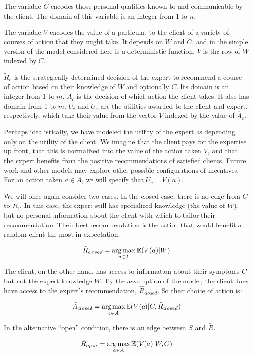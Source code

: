 \documentclass[../thesis.tex]{subfiles}
\begin{document}
The variable $C$ encodes those personal qualities known to
and communicable by the client.
The domain of this variable is an integer from 1 to $n$.

The variable $V$ encodes the value of a particular to the client
of a variety of courses of action that they might take.
It depends on $W$ and $C$, and in the simple version of the
model considered here is a deterministic function: $V$
is the row of $W$ indexed by $C$.

$\tilde{R}_e$ is the strategically determined decision of
the expert to recommend a course of action based on their
knowledge of $W$ and optionally $C$. Its domain is an
integer from 1 to $m$.
$\tilde{A}_c$ is the decision of which action the client takes.
It also has domain from 1 to $m$.
$U_c$ and $U_e$ are the utilities awarded to the client and expert,
respectively, which take their value from the vector $V$ indexed
by the value of $\hat{A}_c$.

Perhaps idealistically, we have modeled the utility
of the expert as depending only on the utility of the
client.
We imagine that the client pays for the expertise
up front, that this is normalized into the value
of the action taken $V$, and that the expert
benefits from the positive recommendations of
satisfied clients.
Future work and other models may explore other
possible configurations of incentives.
For an action taken $a \in A$, we will
specify that $U_c = V(a)$.

We will once again consider two cases.
In the closed case, there is no edge from
$C$ to $\tilde{R}_e$.
In this case, the expert still has specialized knowledge
(the value of $W$), but no personal information about the
client with which to tailor their recommendation.
Their best recommendation is the action that would
benefit a random client the most in expectation.

$$\hat{R}_{closed} = \operatorname*{arg\,max}_{a \in A} \mathbb{E}(V(a) \vert W)$$

The client, on the other hand, has access to information
about their symptoms $C$ but not the expert knowledge $W$.
By the assumption of the model, the client does have access
to the expert's recommendation, $\hat{R}_{closed}$.
So their choice of action is:

$$\hat{A}_{closed} = \operatorname*{arg\,max}_{a \in A} \mathbb{E}(V(a) \vert C, \hat{R}_{closed})$$

In the alternative ``open'' condition, there is an edge between
$S$ and $\tilde{R}$.

$$\hat{R}_{open} = \operatorname*{arg\,max}_{a \in A} \mathbb{E}(V(a) \vert W,C)$$
\end{document}
